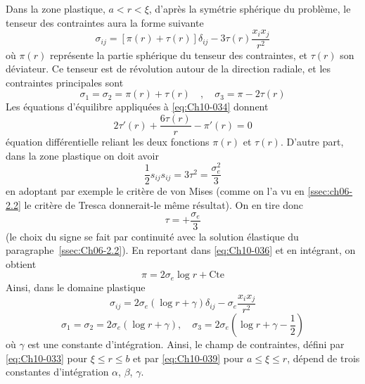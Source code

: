 Dans la zone plastique, $a<r<\xi$, d'après la symétrie sphérique du problème, le tenseur des contraintes aura la forme suivante 
\begin{equation}
    \sigma_{ij} = \left[ \pi(r) + \tau(r) \right] \delta_{ij} - 3 \tau(r) \frac{x_ix_j}{r^2}
    \label{eq:Ch10-033}
\end{equation}
où $\pi(r)$ représente la partie sphérique du tenseur des contraintes, et $\tau(r)$ son déviateur.
Ce tenseur est de révolution autour de la direction radiale, et les contraintes principales sont 
\begin{equation}
    \sigma_1 = \sigma_2 = \pi(r) + \tau(r) \quad,\quad \sigma_3 = \pi - 2\tau(r)
    \label{eq:Ch10-035}
\end{equation}
Les équations d'équilibre appliquées à \eqref{eq:Ch10-034} donnent 
\begin{equation}
    2\tau'(r) + \frac{6\tau(r)}{r} - \pi'(r) = 0
    \label{eq:Ch10-036}
\end{equation}
équation différentielle reliant les deux fonctions $\pi(r)$ et $\tau(r)$. 
D'autre part, dans la zone plastique on doit avoir 
\[
\frac{1}{2} s_{ij} s_{ij} = 3 \tau^2 = \frac{\sigma_e^2}{3}
\]
en adoptant par exemple le critère de von Mises (comme on l'a vu en \ref{ssec:ch06-2.2} le critère de Tresca donnerait-le même résultat).
On en tire donc 
\begin{equation}
    \tau = + \frac{\sigma_e}{3}
    \label{eq:Ch10-037}
\end{equation}
(le choix du signe se fait par continuité avec la solution élastique du paragraphe~\ref{ssec:Ch06-2.2}).
En reportant dans \eqref{eq:Ch10-036} et en intégrant, on obtient 
\begin{equation}
    \pi = 2 \sigma_e \log r + \text{Cte}
    \label{eq:Ch10-038}
\end{equation}
Ainsi, dans le domaine plastique 
\begin{equation}
    \sigma_{ij} = 2 \sigma_e \left( \log r + \gamma \right) \delta_{ij} - \sigma_e \frac{x_ix_j}{r^2}
    \label{eq:Ch10-039}
\end{equation}
\begin{equation}
    \sigma_1 = \sigma_2 = 2 \sigma_e \left( \log r + \gamma \right), \quad \sigma_3 = 2 \sigma_e \left( \log r + \gamma - \frac{1}{2} \right)
    \label{eq:Ch10-040}
\end{equation}
où $\gamma$ est une constante d'intégration.
Ainsi, le champ de contraintes, défini par \eqref{eq:Ch10-033} pour $\xi \leq r \leq b$ et par \eqref{eq:Ch10-039} pour $a \leq \xi \leq r$, dépend de trois constantes d'intégration $\alpha$, $\beta$, $\gamma$.
